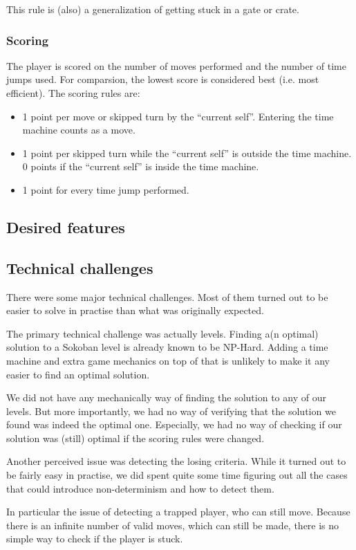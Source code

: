 This rule is (also) a generalization of getting stuck in a gate or
crate.

\subsubsection{Scoring}
The player is scored on the number of moves performed and the number
of time jumps used.  For comparsion, the lowest score is considered
best (i.e. most efficient).  The scoring rules are:

\begin{itemize}
\item 1 point per move or skipped turn by the ``current self''.
  Entering the time machine counts as a move.
\item 1 point per skipped turn while the ``current self'' is outside
  the time machine.  0 points if the ``current self'' is inside the
  time machine.
\item 1 point for every time jump performed.
\end{itemize}

\subsection{Desired features}

\subsection{Technical challenges}
There were some major technical challenges.  Most of them turned out to be
easier to solve in practise than what was originally expected.

The primary technical challenge was actually levels.  Finding a(n
optimal) solution to a Sokoban level is already known to be NP-Hard.
Adding a time machine and extra game mechanics on top of that is
unlikely to make it any easier to find an optimal solution.

We did not have any mechanically way of finding the solution to any of
our levels.  But more importantly, we had no way of verifying that the
solution we found was indeed the optimal one.  Especially, we had no
way of checking if our solution was (still) optimal if the scoring rules
were changed.

Another perceived issue was detecting the losing criteria.  While it
turned out to be fairly easy in practise, we did spent quite some time
figuring out all the cases that could introduce non-determinism and
how to detect them.

In particular the issue of detecting a trapped player, who can still
move. Because there is an infinite number of valid moves, which can
still be made, there is no simple way to check if the player is stuck.

